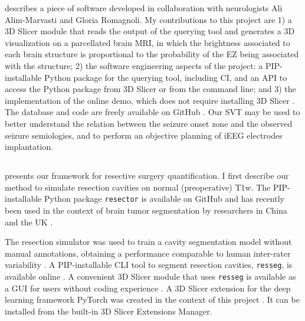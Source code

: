  describes a piece of software developed in collaboration with neurologists Ali Alim-Marvasti and Gloria Romagnoli.
My contributions to this project are
1) a 3D Slicer module \cite{fedorov_3d_2012} that reads the output of the querying tool and generates a 3D visualization on a parcellated brain \ac{MRI}, in which the brightness associated to each brain structure is proportional to the probability of the \ac{EZ} being associated with the structure;
2) the software engineering aspects of the project: a \ac{PIP}-installable Python package for the querying tool, including \ac{CI}, and an \ac{API} to access the Python package from 3D Slicer or from the command line; and
3) the implementation of the online demo, which does not require installing 3D Slicer%
.
The database and code are freely available on GitHub%
\fnurl{\svtgithub}.
Our \ac{SVT} may be used to better understand the relation between the seizure onset zone and the observed seizure semiologies, and to perform an objective planning of \ac{iEEG} electrodes implantation.


\subsection{}

 presents our framework for resective surgery quantification.
I first describe our method to simulate resection cavities on normal (preoperative) \ac{T1w}.
The \ac{PIP}-installable Python package \texttt{resector} is available on GitHub%
and has recently been used in the context of brain tumor segmentation by researchers in China and the UK \cite{zhang_self-supervised_2021}.

The resection simulator was used to train a cavity segmentation model without manual annotations, obtaining a performance comparable to human inter-rater variability \cite{perez-garcia_simulation_2020}.
A \ac{PIP}-installable \ac{CLI} tool to segment resection cavities, \texttt{resseg}, is available online%
.
A convenient 3D Slicer module that uses \texttt{resseg} is available as a \ac{GUI} for users without coding experience%
.
A 3D Slicer extension for the deep learning framework PyTorch was created in the context of this project%
.
It can be installed from the built-in 3D Slicer Extensions Manager.

